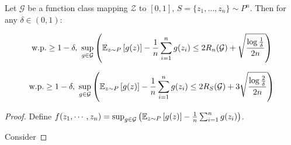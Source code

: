 \begin{theorem}
    Let \(\mathcal{G}\) be a function class mapping \(\mathcal{Z}\) to \([0,1]\), \(S = \{z_1, \ldots, z_n\} \sim P^n\). 
    Then for any \(\delta \in (0, 1)\): 

    \[
        \text{w.p.} \geq 1 - \delta, \  \sup_{g\in \mathcal{G}} \left(\mathbb{E}_{z \sim P} \left[ g(z) \right]
        - \frac{1}{n} \sum_{i=1}^n g(z_i) \leq 2 R_n (\mathcal{G}) + \sqrt{\frac{\log \frac{1}{\delta}}{2n}}\right)  
    \]

    \[
        \text{w.p.} \geq 1 - \delta, \  \sup_{g\in \mathcal{G}} \left(\mathbb{E}_{z \sim P} \left[ g(z) \right]
        - \frac{1}{n} \sum_{i=1}^n g(z_i) \leq 2 R_S (\mathcal{G}) + 3\sqrt{\frac{\log \frac{2}{\delta}}{2n}}\right)  
    \]
    
\end{theorem}


\begin{proof}
    Define \(f(z_1, \cdots, z_n) = \sup_{g \in \mathcal{G}} \left(\mathbb{E}_{z \sim P}\left[ g(z) \right] - \frac{1}{n}\sum_{i=1}^n g(z_i)
    \right)\). 

    Consider 
\end{proof}